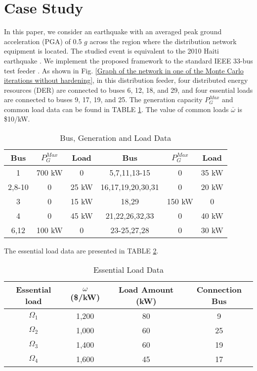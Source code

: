 \documentclass[conference]{IEEEtran}
\begin{document}
 \section{Case Study}
In this paper, we consider an earthquake with an averaged peak ground acceleration (PGA) of 0.5 $g$ across the region where the distribution network equipment is located. The studied event is equivalent to the 2010 Haiti earthquake \cite{Athena_Heiti_2010}. We implement the proposed framework to the standard IEEE 33-bus test feeder \cite{Baran_Network_1989}. As shown in Fig. \ref{Graph of the network in one of the Monte Carlo iterations without hardening}, in this distribution feeder,  four distributed energy resources (DER) are connected to buses 6, 12, 18, and 29, and four essential loads are connected to buses 9, 17, 19, and 25. The generation capacity $P_G^{Max}$ and common load data can be found in TABLE \ref{bus,gen,load data}. The value of common loads $\bar{\omega}$ is \$10/kW.\begin{table}[!htb]
\centering
\caption{\label{bus,gen,load data}Bus, Generation and Load Data}
 \begin{tabular}{ccc|ccc} 
 \hline
 Bus & $P_G^{Max}$ & Load & Bus & $P_G^{Max}$ & Load \\ 
 \hline
 1 & 700 kW & 0 & 5,7,11,13-15 & 0 & 35 kW  \\ 
 2,8-10 & 0 & 25 kW & 16,17,19,20,30,31 & 0 & 20 kW    \\
 3 & 0 & 15 kW &  18,29 & 150 kW & 0   \\
 4 & 0 & 45 kW & 21,22,26,32,33 & 0 & 40 kW  \\
 6,12 & 100 kW & 0 & 23-25,27,28 & 0 & 30 kW\\
 \hline
 \end{tabular}
\end{table} 
 The essential load data are presented in TABLE \ref{essential loads}. \begin{table}[!htb] 
\centering
\caption{\label{essential loads}Essential Load Data}
\begin{tabular}{c c c c}
\hline
    Essential load & $\omega$ (\$/kW) & Load Amount (kW)& Connection Bus \\
     \hline
     $\Omega_1$ & 1,200 & 80 & 9 \\
     $\Omega_2$ & 1,000 & 60 & 25 \\
     $\Omega_3$ & 1,400 & 60 & 19 \\
     $\Omega_4$ & 1,600 & 45 & 17 \\
     \hline
\end{tabular}
\end{table}
\end{document}
